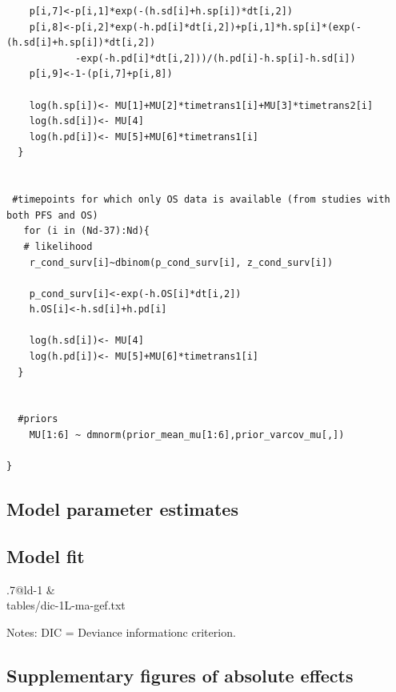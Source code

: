 \documentclass[11pt,final,fleqn]{article}\usepackage[]{graphicx}\usepackage[]{color}
\makeatletter
\theoremstyle{plain}
\newcommand*\ExpandableInput[1]{\@@input#1 }
\makeatother
\begin{document}
\begin{appendices}
\begin{verbatim}
    p[i,7]<-p[i,1]*exp(-(h.sd[i]+h.sp[i])*dt[i,2])
    p[i,8]<-p[i,2]*exp(-h.pd[i]*dt[i,2])+p[i,1]*h.sp[i]*(exp(-(h.sd[i]+h.sp[i])*dt[i,2])
    		-exp(-h.pd[i]*dt[i,2]))/(h.pd[i]-h.sp[i]-h.sd[i])
    p[i,9]<-1-(p[i,7]+p[i,8])
    
    log(h.sp[i])<- MU[1]+MU[2]*timetrans1[i]+MU[3]*timetrans2[i] 
    log(h.sd[i])<- MU[4] 
    log(h.pd[i])<- MU[5]+MU[6]*timetrans1[i]
  }
  
  
 #timepoints for which only OS data is available (from studies with both PFS and OS)
   for (i in (Nd-37):Nd){
   # likelihood
    r_cond_surv[i]~dbinom(p_cond_surv[i], z_cond_surv[i]) 
    
    p_cond_surv[i]<-exp(-h.OS[i]*dt[i,2])
    h.OS[i]<-h.sd[i]+h.pd[i]
    
    log(h.sd[i])<- MU[4]
    log(h.pd[i])<- MU[5]+MU[6]*timetrans1[i]
  }
    
  
  #priors
    MU[1:6] ~ dmnorm(prior_mean_mu[1:6],prior_varcov_mu[,]) 
  
}

\end{verbatim}

\subsection{Model parameter estimates}

\subsection{Model fit}\label{app:DIC-1l}

\begin{table}[!ht]
\begin{center}
\begin{threeparttable}
\caption{Deviance information criterion for first line fixed effects meta-analysis of gefitinib } \label{tbl:dic-ma-1L}
\begin{tabularx}{.7\textwidth}{@{\extracolsep{\fill}}ld{-1}}
\hline
{} &  \\
\hline
\ExpandableInput{tables/dic-1L-ma-gef.txt}
\hline
\end{tabularx}
\scriptsize
Notes: DIC = Deviance informationc criterion.
\end{threeparttable}
\end{center}
\end{table}

\subsection{Supplementary figures of absolute effects}\label{app:1l-supp-figs}


\end{appendices}
\end{document}
